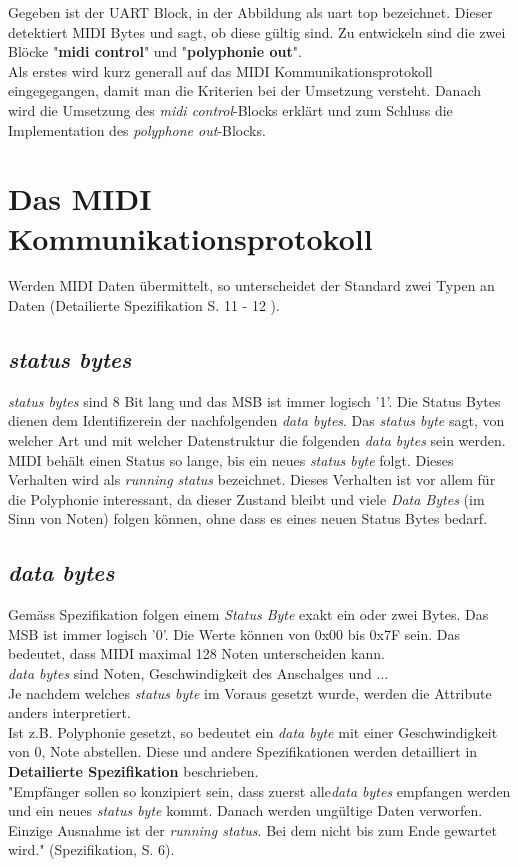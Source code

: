 Gegeben ist der UART Block, in der Abbildung als uart top bezeichnet. Dieser detektiert MIDI Bytes und sagt, ob diese gültig sind. Zu entwickeln sind die zwei Blöcke "\textbf{midi control}" und "\textbf{polyphonie out}".\\

Als erstes wird kurz generall auf das MIDI Kommunikationsprotokoll eingegegangen, damit man die Kriterien bei der Umsetzung versteht. Danach wird die Umsetzung des \textit{midi control}-Blocks erklärt und zum Schluss die Implementation des \textit{polyphone out}-Blocks.\\


\newpage
\section{Das MIDI Kommunikationsprotokoll}\label{sect.midi_spezification}
Werden MIDI Daten übermittelt, so unterscheidet der Standard zwei Typen an Daten (Detailierte Spezifikation S. 11 - 12 ).
\subsection{\textit{status bytes}}
\textit{status bytes} sind 8 Bit lang und das MSB ist immer logisch '1'. Die Status Bytes dienen dem Identifizerein der nachfolgenden \textit{data bytes}. Das \textit{status byte} sagt, von welcher Art und mit welcher Datenstruktur die folgenden \textit{data bytes} sein werden.\\
MIDI behält einen Status so lange, bis ein neues \textit{status byte} folgt. Dieses Verhalten wird als \textit{running status} bezeichnet. Dieses Verhalten ist vor allem für die Polyphonie interessant, da dieser Zustand bleibt und viele \textit{Data Bytes} (im Sinn von Noten) folgen können, ohne dass es eines neuen Status Bytes bedarf.\\

\subsection{\textit{data bytes}}
Gemäss Spezifikation folgen einem \textit{Status Byte} exakt ein oder zwei Bytes. Das MSB ist immer logisch '0'. Die Werte können von 0x00 bis 0x7F sein. Das bedeutet, dass MIDI maximal 128 Noten unterscheiden kann.\\
\textit{data bytes} sind Noten, Geschwindigkeit des Anschalges und ...\\
Je nachdem welches \textit{status byte} im Voraus gesetzt wurde, werden die Attribute anders interpretiert.\\
Ist z.B. Polyphonie gesetzt, so bedeutet ein \textit{data byte} mit einer Geschwindigkeit von 0, Note abstellen. Diese und andere Spezifikationen werden detailliert in \textbf{Detailierte Spezifikation} beschrieben.
\\
"Empfänger sollen so konzipiert sein, dass zuerst alle\textit{data bytes} empfangen werden und ein neues \textit{status byte} kommt. Danach werden ungültige Daten verworfen. Einzige Ausnahme ist der \textit{running status}. Bei dem nicht bis zum Ende gewartet wird." (Spezifikation, S. 6).\\

